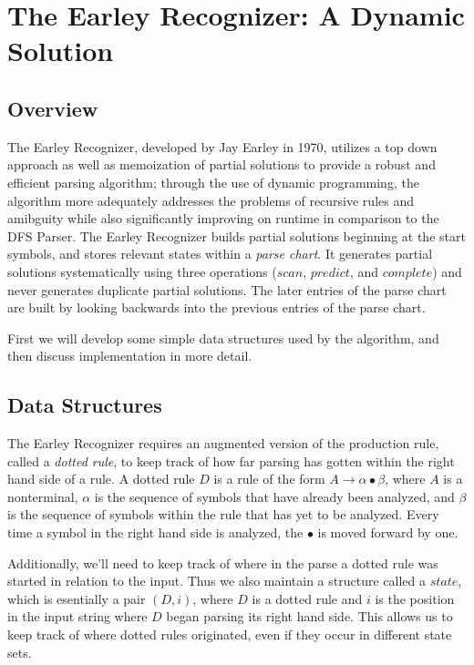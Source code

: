 \documentclass[a4paper, 11pt]{article}
\begin{document}
\section{The Earley Recognizer: A Dynamic Solution}

\subsection{Overview}
The Earley Recognizer, developed by Jay Earley in 1970, utilizes a top down approach as well as memoization of partial solutions to provide a robust and efficient parsing
algorithm; through the use of dynamic programming, the algorithm more adequately addresses the problems of recursive rules and amibguity while also significantly 
improving on runtime in comparison to the DFS Parser. The Earley Recognizer builds partial solutions beginning at the start symbols, and stores relevant states within
a \textit{parse chart}. It generates partial solutions systematically using three operations ($scan$, $predict$, and $complete$) and never generates 
duplicate partial solutions. The later entries of the parse chart are built by looking backwards into the previous entries of the parse chart. 

First we will develop some simple data structures used by the algorithm, and then discuss implementation in more detail.

\subsection{Data Structures}
The Earley Recognizer requires an augmented version of the production rule, called a \textit{dotted rule}, 
to keep track of how far parsing has gotten within the right hand side of a
rule. A dotted rule $D$ is a rule of the form $A \to \alpha \bullet \beta$, where $A$ is a nonterminal, $\alpha$ is the sequence of symbols that have already been analyzed,
and $\beta$ is the sequence of symbols within the rule that has yet to be analyzed. Every time a symbol in the right hand side is analyzed, the $\bullet$ is moved forward
by one. 

Additionally, we'll need to keep track of where in the parse a dotted rule was started in relation to the input. Thus we also maintain a structure called a $state$, which is
esentially a pair $(D, i)$, where $D$ is a dotted rule and $i$ is the position in the input string where $D$ began parsing its right hand side. This allows us to keep track
of where dotted rules originated, even if they occur in different state sets.
 
\end{document}
